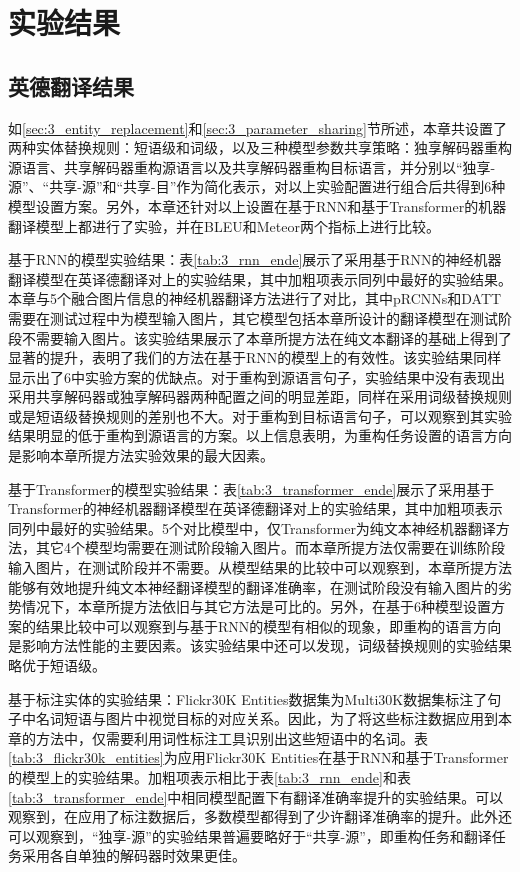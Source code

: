 \section{实验结果}

\subsection{英德翻译结果}

如\ref{sec:3_entity_replacement}和\ref{sec:3_parameter_sharing}节所述，本章共设置了两种实体替换规则：短语级和词级，以及三种模型参数共享策略：独享解码器重构源语言、共享解码器重构源语言以及共享解码器重构目标语言，并分别以“独享-源”、“共享-源”和“共享-目”作为简化表示，对以上实验配置进行组合后共得到6种模型设置方案。另外，本章还针对以上设置在基于RNN和基于Transformer的机器翻译模型上都进行了实验，并在BLEU和Meteor两个指标上进行比较。

{\sffamily 基于RNN的模型实验结果：}表\ref{tab:3_rnn_ende}展示了采用基于RNN的神经机器翻译模型在英译德翻译对上的实验结果，其中加粗项表示同列中最好的实验结果。本章与5个融合图片信息的神经机器翻译方法进行了对比，其中pRCNNs和DATT需要在测试过程中为模型输入图片，其它模型包括本章所设计的翻译模型在测试阶段不需要输入图片。该实验结果展示了本章所提方法在纯文本翻译的基础上得到了显著的提升，表明了我们的方法在基于RNN的模型上的有效性。该实验结果同样显示出了6中实验方案的优缺点。对于重构到源语言句子，实验结果中没有表现出采用共享解码器或独享解码器两种配置之间的明显差距，同样在采用词级替换规则或是短语级替换规则的差别也不大。对于重构到目标语言句子，可以观察到其实验结果明显的低于重构到源语言的方案。以上信息表明，为重构任务设置的语言方向是影响本章所提方法实验效果的最大因素。


{\sffamily 基于Transformer的模型实验结果：}表\ref{tab:3_transformer_ende}展示了采用基于Transformer的神经机器翻译模型在英译德翻译对上的实验结果，其中加粗项表示同列中最好的实验结果。5个对比模型中，仅Transformer为纯文本神经机器翻译方法，其它4个模型均需要在测试阶段输入图片。而本章所提方法仅需要在训练阶段输入图片，在测试阶段并不需要。从模型结果的比较中可以观察到，本章所提方法能够有效地提升纯文本神经翻译模型的翻译准确率，在测试阶段没有输入图片的劣势情况下，本章所提方法依旧与其它方法是可比的。另外，在基于6种模型设置方案的结果比较中可以观察到与基于RNN的模型有相似的现象，即重构的语言方向是影响方法性能的主要因素。该实验结果中还可以发现，词级替换规则的实验结果略优于短语级。


{\sffamily 基于标注实体的实验结果：}Flickr30K Entities数据集为Multi30K数据集标注了句子中名词短语与图片中视觉目标的对应关系。因此，为了将这些标注数据应用到本章的方法中，仅需要利用词性标注工具识别出这些短语中的名词。表\ref{tab:3_flickr30k_entities}为应用Flickr30K Entities在基于RNN和基于Transformer的模型上的实验结果。加粗项表示相比于表\ref{tab:3_rnn_ende}和表\ref{tab:3_transformer_ende}中相同模型配置下有翻译准确率提升的实验结果。可以观察到，在应用了标注数据后，多数模型都得到了少许翻译准确率的提升。此外还可以观察到，“独享-源”的实验结果普遍要略好于“共享-源”，即重构任务和翻译任务采用各自单独的解码器时效果更佳。

